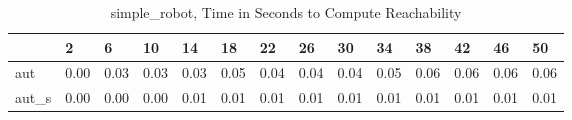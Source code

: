\begin{table}
\caption{simple_robot, Time in Seconds to Compute Reachability}
\label{simple_robot_states_time}
\begin{tabular}{llllllllllllll}
\toprule
 & 2 & 6 & 10 & 14 & 18 & 22 & 26 & 30 & 34 & 38 & 42 & 46 & 50 \\
\midrule
aut & 0.00 & 0.03 & 0.03 & 0.03 & 0.05 & 0.04 & 0.04 & 0.04 & 0.05 & 0.06 & 0.06 & 0.06 & 0.06 \\
aut_s & 0.00 & 0.00 & 0.00 & 0.01 & 0.01 & 0.01 & 0.01 & 0.01 & 0.01 & 0.01 & 0.01 & 0.01 & 0.01 \\
\bottomrule
\end{tabular}
\end{table}
